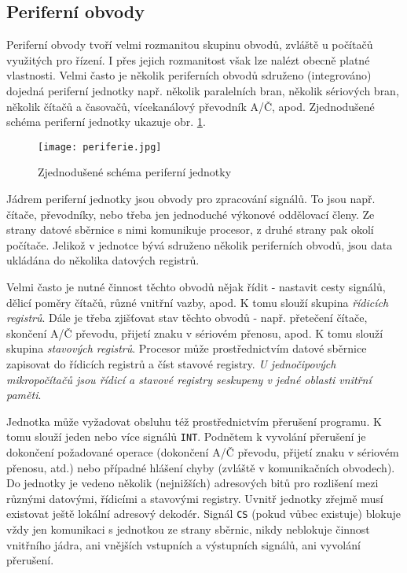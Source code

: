     \subsection{Periferní obvody}
      Periferní obvody tvoří velmi rozmanitou skupinu obvodů, zvláště u počítačů využitých pro řízení. I přes 
      jejich rozmanitost však lze nalézt obecně platné vlastnosti. Velmi často je několik periferních obvodů 
      sdruženo (integrováno) dojedná periferní jednotky např. několik paralelních bran, několik sériových 
      bran, několik čítačů a časovačů, vícekanálový převodník A/Č, apod.
      Zjednodušené schéma periferní jednotky ukazuje obr. \ref{MIT:fig_periferie}.
      \begin{figure}[ht!] %
        \centering
        \texttt{[image: periferie.jpg]}
        \caption{Zjednodušené schéma periferní jednotky}
        \label{MIT:fig_periferie}
      \end{figure}
      
      Jádrem periferní jednotky jsou obvody pro zpracování signálů. To jsou např. čítače, převodníky, nebo 
      třeba jen jednoduché výkonové oddělovací členy. Ze strany datové sběrnice s nimi komunikuje procesor, z 
      druhé strany pak okolí počítače. Jelikož v jednotce bývá sdruženo několik periferních obvodů, jsou data 
      ukládána do několika datových registrů.
      
      Velmi často je nutné činnost těchto obvodů nějak řídit - nastavit cesty signálů, dělicí poměry čítačů, 
      různé vnitřní vazby, apod. K tomu slouží skupina \emph{řídicích registrů}. Dále je třeba zjišťovat stav 
      těchto obvodů - např. přetečení čítače, skončení A/Č převodu, přijetí znaku v sériovém přenosu, apod. K 
      tomu slouží skupina \emph{stavových registrů}. Procesor může prostřednictvím datové sběrnice zapisovat 
      do řídicích registrů a číst stavové registry. \emph{U jednočipových mikropočítačů jsou řídicí a stavové 
      registry seskupeny v jedné oblasti vnitřní paměti}.
      
      Jednotka může vyžadovat obsluhu též prostřednictvím přerušení programu. K tomu slouží jeden nebo více 
      signálů \texttt{INT}. Podnětem k vyvolání přerušení je dokončení požadované operace (dokončení A/Č 
      převodu, přijetí znaku v sériovém přenosu, atd.) nebo případné hlášení chyby (zvláště v komunikačních 
      obvodech). Do jednotky je vedeno několik (nejnižších) adresových bitů pro rozlišení mezi různými 
      datovými, řídicími a stavovými registry. Uvnitř jednotky zřejmě musí existovat ještě lokální adresový 
      dekodér. Signál \texttt{CS} (pokud vůbec existuje) blokuje vždy jen komunikaci s jednotkou ze strany 
      sběrnic, nikdy neblokuje činnost vnitřního jádra, ani vnějších vstupních a výstupních signálů, ani 
      vyvolání přerušení.
      
